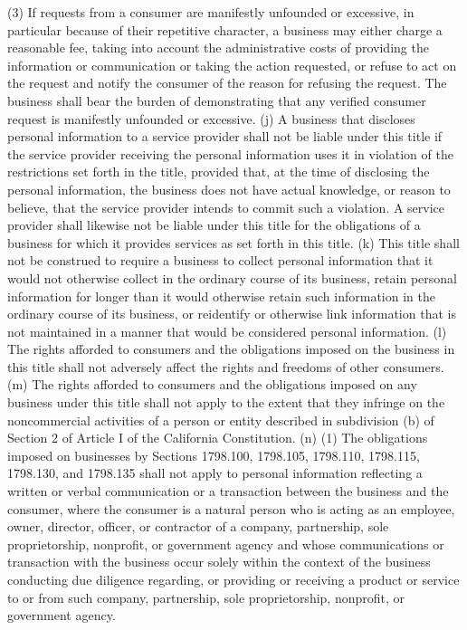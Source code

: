 (3) If requests from a consumer are manifestly unfounded or excessive, in particular because of their repetitive character, a business may either charge a reasonable fee, taking into account the administrative costs of providing the information or communication or taking the action requested, or refuse to act on the request and notify the consumer of the reason for refusing the request. The business shall bear the burden of demonstrating that any verified consumer request is manifestly unfounded or excessive.
(j) A business that discloses personal information to a service provider shall not be liable under this title if the service provider receiving the personal information uses it in violation of the restrictions set forth in the title, provided that, at the time of disclosing the personal information, the business does not have actual knowledge, or reason to believe, that the service provider intends to commit such a violation. A service provider shall likewise not be liable under this title for the obligations of a business for which it provides services as set forth in this title.
(k) This title shall not be construed to require a business to collect personal information that it would not otherwise collect in the ordinary course of its business, retain personal information for longer than it would otherwise retain such information in the ordinary course of its business, or reidentify or otherwise link information that is not maintained in a manner that would be considered personal information.
(l) The rights afforded to consumers and the obligations imposed on the business in this title shall not adversely affect the rights and freedoms of other consumers.
(m) The rights afforded to consumers and the obligations imposed on any business under this title shall not apply to the extent that they infringe on the noncommercial activities of a person or entity described in subdivision (b) of Section 2 of Article I of the California Constitution.
(n) (1) The obligations imposed on businesses by Sections 1798.100, 1798.105, 1798.110, 1798.115, 1798.130, and 1798.135 shall not apply to personal information reflecting a written or verbal communication or a transaction between the business and the consumer, where the consumer is a natural person who is acting as an employee, owner, director, officer, or contractor of a company, partnership, sole proprietorship, nonprofit, or government agency and whose communications or transaction with the business occur solely within the context of the business conducting due diligence regarding, or providing or receiving a product or service to or from such company, partnership, sole proprietorship, nonprofit, or government agency.

